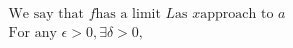 \documentclass[preview]{standalone}
\begin{document}
\begin{align*}
{\text{We say that } f \text{has a limit } L \text{as } x \text{approach to } a} \\\text{For any }\epsilon > 0, \exists \delta > 0,
\end{align*}
\end{document}
